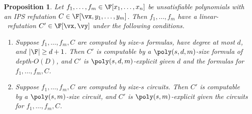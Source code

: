 \documentclass[11pt]{article}
\numberwithin{equation}{section}
\newtheorem{proposition}[theorem]{Proposition}
\theoremstyle{definition}
\theoremstyle{plain}
\begin{document}
\begin{proposition}\label{res:h-ips_v_ips}
        Let $f_1,\ldots,f_m\in\F[x_1,\ldots,x_n]$ be unsatisfiable polynomials with an IPS refutation $C\in\F[\vx,y_1,\ldots,y_m]$.  Then $f_1,\ldots,f_m$ have a linear-\IPS\ refutation $C'\in\F[\vx,\vy]$ under the following conditions.
        \begin{enumerate}
                \item Suppose $f_1,\ldots,f_m,C$ are computed by size-$s$ formulas, have degree at most $d$, and $|\F|\ge d+1$. Then $C'$ is computable by a $\poly(s,d,m)$-size formula of depth-$O(D)$, and $C'$ is $\poly(s,d,m)$-explicit given $d$ and the formulas for $f_1,\ldots,f_m,C$.
                        \label{res:h-ips_v_ips:formula}
                \item Suppose $f_1,\ldots,f_m,C$ are computed by size-$s$ circuits. Then $C'$ is computable by a $\poly(s,m)$-size circuit, and $C'$ is $\poly(s,m)$-explicit given the circuits for $f_1,\ldots,f_m,C$.
                        \label{res:h-ips_v_ips:circuit}
        \end{enumerate}
\end{proposition}
\end{document}
